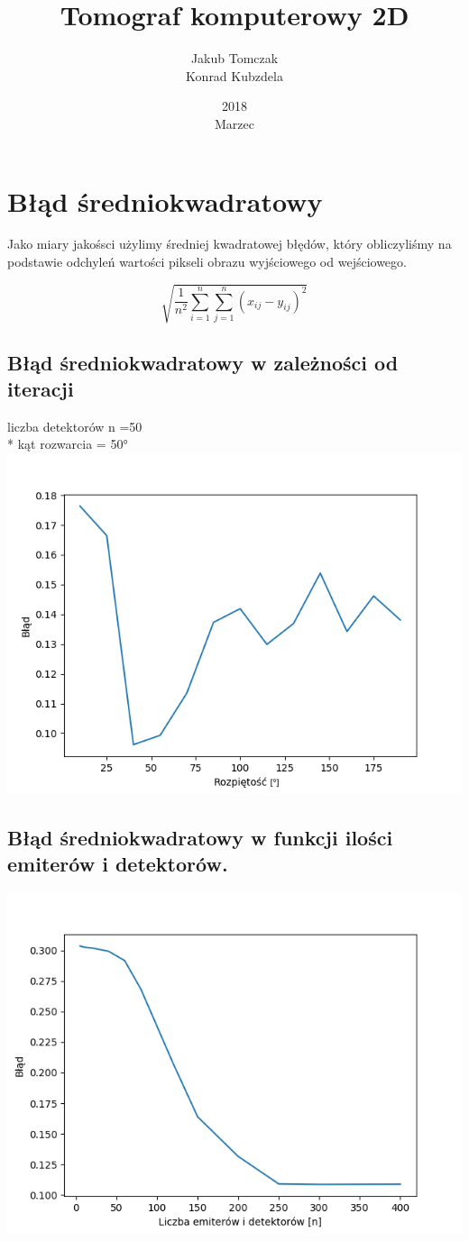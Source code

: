 \documentclass{article}
\title{Tomograf komputerowy 2D}
\date{2018\\ Marzec}
\author{Jakub Tomczak \\ Konrad Kubzdela}
\begin{document}
\maketitle

\section{Błąd średniokwadratowy}
Jako miary jakośsci użylimy średniej kwadratowej błędów, który obliczyliśmy na podstawie odchyleń wartości pikseli obrazu wyjściowego od wejściowego.

$$\sqrt{\frac{1}{n^2} \sum\limits_{i=1}^n\sum\limits_{j=1}^n (x_{ij}-y_{ij})^2}$$ 
\clearpage
\subsection{Błąd średniokwadratowy w zależności od iteracji}
\centering liczba detektorów n =50\\*
kąt rozwarcia = \ang{50}
\includegraphics[width=\textwidth]{wykres3}
\centering

\subsection
 {Błąd średniokwadratowy w funkcji ilości emiterów i detektorów.}
\includegraphics[width=\textwidth]{wykres}
\centering
\end{document}
